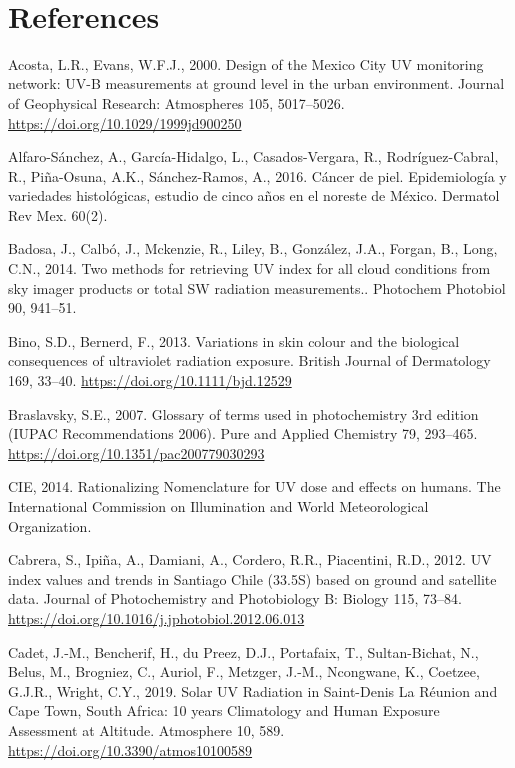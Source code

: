 \documentclass[10pt]{article}
\begin{document}
~

\FloatBarrier
\section*{References}\sloppy
{}
\label{csl:18}Acosta, L.R., Evans, W.F.J., 2000. {Design of the Mexico City {UV} monitoring network: {UV}-B measurements at ground level in the urban environment}. Journal of Geophysical Research: Atmospheres 105, 5017–5026. \url{https://doi.org/10.1029/1999jd900250}

\label{csl:72}Alfaro-Sánchez, A., García-Hidalgo, L., Casados-Vergara, R., Rodríguez-Cabral, R., Piña-Osuna, A.K., Sánchez-Ramos, A., 2016. {Cáncer de piel. Epidemiología y variedades histológicas, estudio de cinco años en el noreste de México}. Dermatol Rev Mex. 60(2).

\label{csl:67}Badosa, J., Calbó, J., Mckenzie, R., Liley, B., González, J.A., Forgan, B., Long, C.N., 2014. {Two methods for retrieving UV index for all cloud conditions from sky imager products or total SW radiation measurements.}. Photochem Photobiol 90, 941–51.

\label{csl:42}Bino, S.D., Bernerd, F., 2013. {Variations in skin colour and the biological consequences of ultraviolet radiation exposure}. British Journal of Dermatology 169, 33–40. \url{https://doi.org/10.1111/bjd.12529}

\label{csl:29}Braslavsky, S.E., 2007. {Glossary of terms used in photochemistry 3rd edition ({IUPAC} Recommendations 2006)}. Pure and Applied Chemistry 79, 293–465. \url{https://doi.org/10.1351/pac200779030293}

\label{csl:23}CIE, 2014. {Rationalizing Nomenclature for UV dose and effects on humans}. The International Commission on Illumination and World Meteorological Organization.

\label{csl:69}Cabrera, S., Ipi{\~{n}}a, A., Damiani, A., Cordero, R.R., Piacentini, R.D., 2012. {{UV} index values and trends in Santiago Chile (33.5{\textdegree}S) based on ground and satellite data}. Journal of Photochemistry and Photobiology B: Biology 115, 73–84. \url{https://doi.org/10.1016/j.jphotobiol.2012.06.013}

\label{csl:62}Cadet, J.-M., Bencherif, H., du Preez, D.J., Portafaix, T., Sultan-Bichat, N., Belus, M., Brogniez, C., Auriol, F., Metzger, J.-M., Ncongwane, K., Coetzee, G.J.R., Wright, C.Y., 2019. {Solar {UV} Radiation in Saint-Denis La R{\'{e}}union and Cape Town, South Africa: 10 years Climatology and Human Exposure Assessment at Altitude}. Atmosphere 10, 589. \url{https://doi.org/10.3390/atmos10100589}
\end{document}
